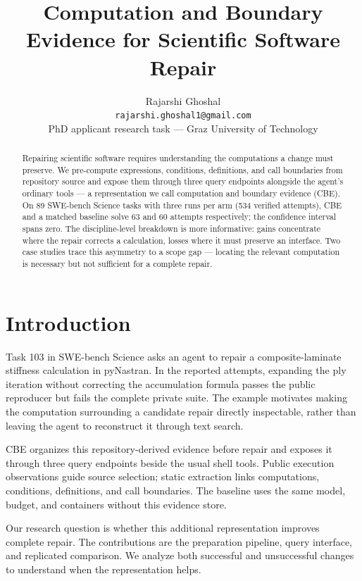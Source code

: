 \documentclass[11pt,a4paper,twocolumn]{article}
\title{Computation and Boundary Evidence for Scientific Software Repair}
\author{Rajarshi Ghoshal\\\texttt{rajarshi.ghoshal1@gmail.com}\\PhD applicant research task --- Graz University of Technology}
\date{}
\begin{document}
\maketitle

\begin{abstract}
Repairing scientific software requires understanding the computations a change must preserve. We pre-compute expressions, conditions, definitions, and call boundaries from repository source and expose them through three query endpoints alongside the agent's ordinary tools --- a representation we call computation and boundary evidence (CBE). On 89 SWE-bench Science tasks with three runs per arm (534 verified attempts), CBE and a matched baseline solve 63 and 60 attempts respectively; the confidence interval spans zero. The discipline-level breakdown is more informative: gains concentrate where the repair corrects a calculation, losses where it must preserve an interface. Two case studies trace this asymmetry to a scope gap --- locating the relevant computation is necessary but not sufficient for a complete repair.
\end{abstract}

\section{Introduction}

Task 103 in SWE-bench Science asks an agent to repair a composite-laminate stiffness calculation in pyNastran. In the reported attempts, expanding the ply iteration without correcting the accumulation formula passes the public reproducer but fails the complete private suite. The example motivates making the computation surrounding a candidate repair directly inspectable, rather than leaving the agent to reconstruct it through text search.

CBE organizes this repository-derived evidence before repair and exposes it through three query endpoints beside the usual shell tools. Public execution observations guide source selection; static extraction links computations, conditions, definitions, and call boundaries. The baseline uses the same model, budget, and containers without this evidence store.

Our research question is whether this additional representation improves complete repair. The contributions are the preparation pipeline, query interface, and replicated comparison. We analyze both successful and unsuccessful changes to understand when the representation helps.
\end{document}
